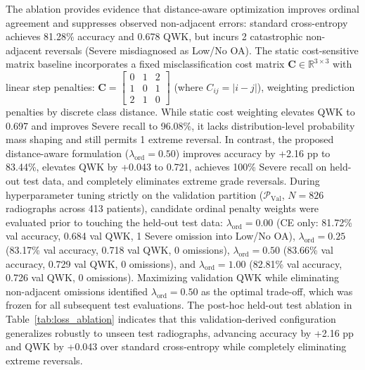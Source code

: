 \documentclass[10pt,journal]{IEEEtran}
\begin{document}
The ablation provides evidence that distance-aware optimization improves ordinal agreement and suppresses observed non-adjacent errors: standard cross-entropy achieves 81.28\% accuracy and 0.678 QWK, but incurs 2 catastrophic non-adjacent reversals (Severe misdiagnosed as Low/No OA). The static cost-sensitive matrix baseline incorporates a fixed misclassification cost matrix $\mathbf{C} \in \mathbb{R}^{3 \times 3}$ with linear step penalties: $\mathbf{C} = \begin{bmatrix} 0 & 1 & 2 \\ 1 & 0 & 1 \\ 2 & 1 & 0 \end{bmatrix}$ (where $C_{ij} = |i - j|$), weighting prediction penalties by discrete class distance. While static cost weighting elevates QWK to 0.697 and improves Severe recall to 96.08\%, it lacks distribution-level probability mass shaping and still permits 1 extreme reversal. In contrast, the proposed distance-aware formulation ($\lambda_{\text{ord}} = 0.50$) improves accuracy by +2.16 pp to 83.44\%, elevates QWK by +0.043 to 0.721, achieves 100\% Severe recall on held-out test data, and completely eliminates extreme grade reversals. During hyperparameter tuning strictly on the validation partition ($\mathcal{P}_{\text{Val}}$, $N = 826$ radiographs across 413 patients), candidate ordinal penalty weights were evaluated prior to touching the held-out test data: $\lambda_{\text{ord}} = 0.00$ (CE only: 81.72\% val accuracy, 0.684 val QWK, 1 Severe omission into Low/No OA), $\lambda_{\text{ord}} = 0.25$ (83.17\% val accuracy, 0.718 val QWK, 0 omissions), $\lambda_{\text{ord}} = 0.50$ (83.66\% val accuracy, 0.729 val QWK, 0 omissions), and $\lambda_{\text{ord}} = 1.00$ (82.81\% val accuracy, 0.726 val QWK, 0 omissions). Maximizing validation QWK while eliminating non-adjacent omissions identified $\lambda_{\text{ord}} = 0.50$ as the optimal trade-off, which was frozen for all subsequent test evaluations. The post-hoc held-out test ablation in Table~\ref{tab:loss_ablation} indicates that this validation-derived configuration generalizes robustly to unseen test radiographs, advancing accuracy by +2.16 pp and QWK by +0.043 over standard cross-entropy while completely eliminating extreme reversals.
\end{document}
